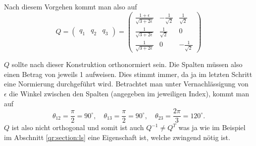 Nach diesem Vorgehen kommt man also auf
\begin{equation}
Q=
\begin{pmatrix}
q_1&q_2&q_3
\end{pmatrix}=
\begin{pmatrix}
\frac{1+\epsilon}{\sqrt{3+2\epsilon}}&-\frac{1}{\sqrt{2}}&\frac{1}{\sqrt{2}}\\
\frac{1}{\sqrt{3+2\epsilon}}&\frac{1}{\sqrt{2}}&0\\
\frac{1}{\sqrt{3+2\epsilon}}&0&-\frac{1}{\sqrt{2}}
\end{pmatrix}\label{qr:qsol}
\end{equation}

$Q$ sollte nach dieser Konstruktion orthonormiert sein.
Die Spalten müssen also einen Betrag von jeweils 1 aufweisen. 
Dies stimmt immer, da ja im letzten Schritt eine Normierung durchgeführt wird.
Betrachtet man unter Vernachlässigung von $\epsilon$ die Winkel zwischen den Spalten (angegeben im jeweiligen Index), kommt man auf
\begin{equation*}
\theta_{12}=\frac{\pi}{2}=90^\circ,\quad \theta_{13}=\frac{\pi}{2}=90^\circ, \quad \theta_{23}=\frac{2\pi}{3}=120^\circ.
\end{equation*}
$Q$ ist also nicht orthogonal und somit ist auch $Q^{-1}\ne Q^T$ was ja wie im Beispiel im Abschnitt \ref{qr:section:ls} eine Eigenschaft ist, welche zwingend nötig ist.

